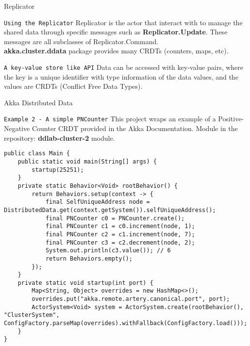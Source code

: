 \documentclass[presentation,apice]{beamer}\mode<presentation>{\usetheme{AMSBolognaFC}}
\begin{document}
\begin{frame}{Replicator}
\begin{block}{\texttt{Using the Replicator}}
Replicator is the actor that interact with to manage the shared data through specific messages such as \textbf{Replicator.Update}. These messages are all subclasses of Replicator.Command.\\
\textbf{akka.cluster.ddata} package provides many CRDTs (counters, maps, etc).
\end{block}
\begin{block}{\texttt{A key-value store like API}}
Data can be accessed with key-value pairs, where the key is a unique identifier with type information of the data values, and the values are CRDTs (Conflict Free Data Types).

\end{block}
\end{frame}

\begin{frame}[c,fragile]{Akka Distributed Data}
\begin{block}{\texttt{Example 2 - A simple PNCounter}}
This project wraps an example of a Positive-Negative Counter CRDT provided in the Akka Documentation.
Module in the repository: \textbf{ddlab-cluster-2} module.
\begin{lstlisting}
public class Main {
    public static void main(String[] args) {
        startup(25251);
    }
    private static Behavior<Void> rootBehavior() {
        return Behaviors.setup(context -> {
            final SelfUniqueAddress node = DistributedData.get(context.getSystem()).selfUniqueAddress();
            final PNCounter c0 = PNCounter.create();
            final PNCounter c1 = c0.increment(node, 1);
            final PNCounter c2 = c1.increment(node, 7);
            final PNCounter c3 = c2.decrement(node, 2);
            System.out.println(c3.value()); // 6
            return Behaviors.empty();
        });
    }
    private static void startup(int port) {
        Map<String, Object> overrides = new HashMap<>();
        overrides.put("akka.remote.artery.canonical.port", port);
        ActorSystem<Void> system = ActorSystem.create(rootBehavior(), "ClusterSystem", ConfigFactory.parseMap(overrides).withFallback(ConfigFactory.load()));
    }
}
\end{lstlisting}

\end{block}
%
\end{frame}
\end{document}
